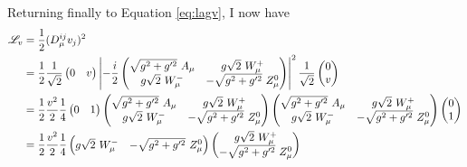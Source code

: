     Returning finally to Equation \ref{eq:lagv}, I now have
    \begin{equation} \begin{split}
        \label{eq:lagv_full}
        \Lag_v & = \frac{1}{2} (D_{\mu}^{ij} v_j)^2 \\
        & = \frac{1}{2}
            \frac{1}{\sqrt{2}} \begin{pmatrix} 0 & v \end{pmatrix}
            \left| -\frac{i}{2}
                \begin{pmatrix} 
                    \sqrt{g^2 + g^{\prime 2}}\ A_{\mu} & g \sqrt{2}\ W^+_{\mu} \\
                    g \sqrt{2}\ W^-_{\mu} & - \sqrt{g^2 + g^{\prime 2}}\ Z^0_{\mu}
                \end{pmatrix}
            \right|^2
            \frac{1}{\sqrt{2}} \begin{pmatrix} 0 \\ v \end{pmatrix} \\
        & = \frac{1}{2} \frac{v^2}{2} \frac{1}{4}
            \begin{pmatrix} 0 & 1 \end{pmatrix}
            \begin{pmatrix} 
                \sqrt{g^2 + g^{\prime 2}}\ A_{\mu} & g \sqrt{2}\ W^+_{\mu} \\
                g \sqrt{2}\ W^-_{\mu} & - \sqrt{g^2 + g^{\prime 2}}\ Z^0_{\mu}
            \end{pmatrix}
            \begin{pmatrix} 
                \sqrt{g^2 + g^{\prime 2}}\ A_{\mu} & g \sqrt{2}\ W^+_{\mu} \\
                g \sqrt{2}\ W^-_{\mu} & - \sqrt{g^2 + g^{\prime 2}}\ Z^0_{\mu}
            \end{pmatrix}
            \begin{pmatrix} 0 \\ 1 \end{pmatrix} \\
        & = \frac{1}{2} \frac{v^2}{2} \frac{1}{4}
            \begin{pmatrix} 
                g \sqrt{2}\ W^-_{\mu} & - \sqrt{g^2 + g^{\prime 2}}\ Z^0_{\mu}
            \end{pmatrix}
            \begin{pmatrix} 
                 g \sqrt{2}\ W^+_{\mu} \\
                 - \sqrt{g^2 + g^{\prime 2}}\ Z^0_{\mu}

\end{pmatrix}
\end{split}
\end{equation}
